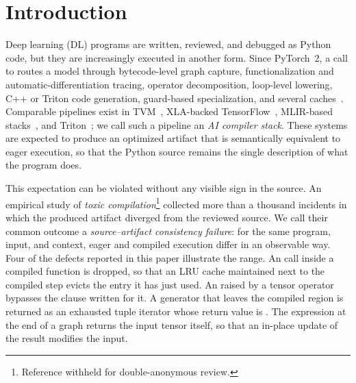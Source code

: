 \section{Introduction}
\label{sec:intro}

Deep learning (DL) programs are written, reviewed, and debugged as Python code, but they are increasingly
executed in another form. Since PyTorch~2, a call to \tcompile routes a model through bytecode-level graph
capture, functionalization and automatic-differentiation tracing, operator decomposition, loop-level lowering,
C++ or Triton code generation, guard-based specialization, and several caches~\cite{DBLP:conf/asplos/AnselYHGJVBBBBC24}.
Comparable pipelines exist in TVM~\cite{DBLP:conf/osdi/ChenMJZYSCWHCGK18}, XLA-backed TensorFlow~\cite{DBLP:conf/osdi/AbadiBCCDDDGIIK16}, MLIR-based
stacks~\cite{DBLP:conf/cgo/LattnerAB0DPRSV21}, and Triton~\cite{DBLP:conf/pldi/TilletKC19}; we call such a pipeline an \emph{AI compiler stack}. These systems are expected to produce an optimized artifact
that is semantically equivalent to eager execution, so that the Python source remains the single description of
what the program does.

This expectation can be violated without any visible sign in the source. An empirical study of \emph{toxic
compilation}\footnote{Reference withheld for double-anonymous review.} collected more than a thousand incidents
in which the produced artifact diverged from the reviewed source. We call their common outcome a
\emph{source--artifact consistency failure}: for the same program, input, and context, eager and compiled
execution differ in an observable way. Four of the defects reported in this paper illustrate the range. An
 call inside a compiled function is dropped, so that an LRU cache maintained
next to the compiled step evicts the entry it has just used. An  raised by a tensor operator
bypasses the  clause written for it. A generator that leaves the compiled region is returned as an
exhausted tuple iterator whose return value is . The expression  at the end of a graph
returns the input tensor itself, so that an in-place update of the result modifies the input.

